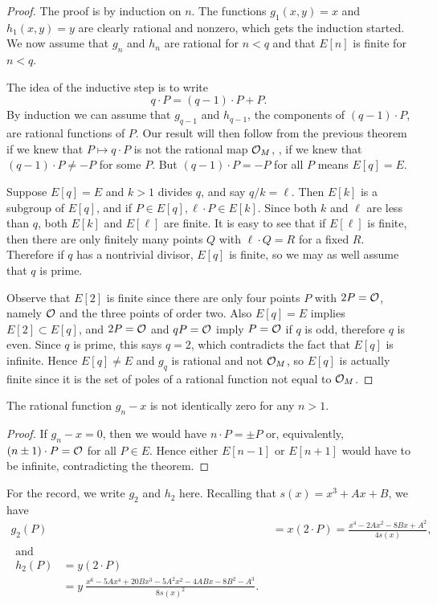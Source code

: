 \begin{proof}
The proof is by induction on $n$. The functions $g_{1}(x, y)=x$ and $h_{1}(x, y)= y$ are clearly rational and nonzero, which gets the induction started. We now assume that $g_{n}$ and $h_{n}$ are rational for $n<q$ and that $E[n]$ is finite for $n<q$.

The idea of the inductive step is to write
\begin{equation}
\label{eq1.11}
q\cdot P=(q-1)\cdot P+P .
\end{equation}
By induction we can assume that $g_{q-1}$ and $h_{q-1}$, the components of $(q-1)\cdot P$, are rational functions of $P$. Our result will then follow from the previous theorem if we knew that $P\mapsto q\cdot P$ is not the rational map $\mathcal{O}_{M}$, \ie, if we knew that $(q-1)\cdot P\neq-P$ for some $P$. But $(q-1)\cdot P=-P$ for all $P$ means $E[q]=E$.

Suppose $E[q]=E$ and $k>1$ divides $q$, and say $q/k=\ell$. Then $E[k]$ is a subgroup of $E[q]$, and if $P\in E[q],\ell\cdot P\in E[k]$. Since both $k$ and $\ell$ are less than $q$, both $E[k]$ and $E[\ell]$ are finite. It is easy to see that if $E[\ell]$ is finite, then there are only finitely many points $Q$ with $\ell\cdot Q=R$ for a fixed $R$. Therefore if $q$ has a nontrivial divisor, $E[q]$ is finite, so we may as well assume that $q$ is prime.

Observe that $E[2]$ is finite since there are only four points $P$ with $2 P=\mathcal{O}$, namely $\mathcal{O}$ and the three points of order two. Also $E[q]=E$ implies $E[2]\subset E[q]$, and $2P = \mathcal{O}$ and $qP=\mathcal{O}$ imply $P=\mathcal{O}$ if $q$ is odd, therefore $q$ is even. Since $q$ is prime, this says $q=2$, which contradicts the fact that $E[q]$ is infinite. Hence $E[q]\neq E$ and $g_{q}$ is rational and not $\mathcal{O}_{M}$, so $E[q]$ is actually finite since it is the set of poles of a rational function not equal to $\mathcal{O}_{M}$.
\end{proof}

\begin{coro}
\label{c7.4}
The rational function $g_{n}-x$ is not identically zero for any $n>1$.
\end{coro}

\begin{proof}
If $g_{n}-x=0$, then we would have $n\cdot P=\pm P$ or, equivalently, $(n\pm 1)\cdot P= \mathcal{O}$ for all $P\in E$. Hence either $E[n-1]$ or $E[n+1]$ would have to be infinite, contradicting the theorem.
\end{proof}
For the record, we write $g_{2}$ and $h_{2}$ here. Recalling that $s(x)=x^{3}+Ax+B$, we have
\begin{align}
\label{eq1.12}
g_{2}(P)&=x(2 \cdot P)=\frac{x^{4}-2Ax^{2}-8Bx+A^{2}}{4s(x)},\\
\begin{split}
\text{and}\\
\label{eq1.13}
h_{2}(P)&=y(2\cdot P)\\
&=y \ \frac{x^{6}-5Ax^{4}+20Bx^{3}-5A^{2}x^{2}-4ABx-8B^{2}-A^{3}}{8s(x)^{2}} .
\end{split}
\end{align}

